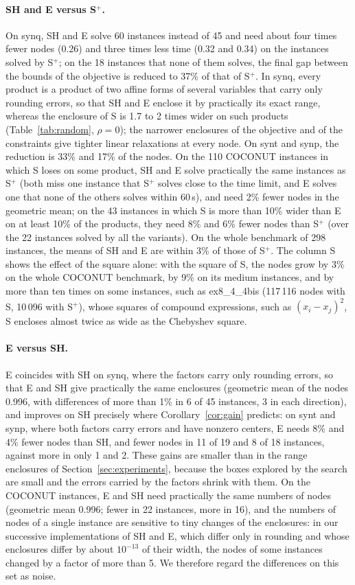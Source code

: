 \documentclass[11pt]{article}
\theoremstyle{definition}
\begin{document}
\paragraph{SH and E versus S$^+$.} On synq, SH and E solve 60 instances instead of 45 and need about four times fewer nodes (0.26) and three times less time (0.32 and 0.34) on the instances solved by S$^+$; on the 18 instances that none of them solves, the final gap between the bounds of the objective is reduced to 37\% of that of S$^+$. In synq, every product is a product of two affine forms of several variables that carry only rounding errors, so that SH and E enclose it by practically its exact range, whereas the enclosure of S is 1.7 to 2 times wider on such products (Table~\ref{tab:random}, $\rho=0$); the narrower enclosures of the objective and of the constraints give tighter linear relaxations at every node. On synt and synp, the reduction is 33\% and 17\% of the nodes. On the 110 COCONUT instances in which S loses on some product, SH and E solve practically the same instances as S$^+$ (both miss one instance that S$^+$ solves close to the time limit, and E solves one that none of the others solves within 60\,s), and need 2\% fewer nodes in the geometric mean; on the 43 instances in which S is more than 10\% wider than E on at least 10\% of the products, they need 8\% and 6\% fewer nodes than S$^+$ (over the 22 instances solved by all the variants). On the whole benchmark of 298 instances, the means of SH and E are within 3\% of those of S$^+$. The column S shows the effect of the square alone: with the square of S, the nodes grow by 3\% on the whole COCONUT benchmark, by 9\% on its medium instances, and by more than ten times on some instances, such as ex8\_4\_4bis (117\,116 nodes with S, 10\,096 with S$^+$), whose squares of compound expressions, such as $(x_i-x_j)^2$, S encloses almost twice as wide as the Chebyshev square.

\paragraph{E versus SH.} E coincides with SH on synq, where the factors carry only rounding errors, so that E and SH give practically the same enclosures (geometric mean of the nodes 0.996, with differences of more than 1\% in 6 of 45 instances, 3 in each direction), and improves on SH precisely where Corollary~\ref{cor:gain} predicts: on synt and synp, where both factors carry errors and have nonzero centers, E needs 8\% and 4\% fewer nodes than SH, and fewer nodes in 11 of 19 and 8 of 18 instances, against more in only 1 and 2. These gains are smaller than in the range enclosures of Section~\ref{sec:experiments}, because the boxes explored by the search are small and the errors carried by the factors shrink with them. On the COCONUT instances, E and SH need practically the same numbers of nodes (geometric mean 0.996; fewer in 22 instances, more in 16), and the numbers of nodes of a single instance are sensitive to tiny changes of the enclosures: in our successive implementations of SH and E, which differ only in rounding and whose enclosures differ by about $10^{-13}$ of their width, the nodes of some instances changed by a factor of more than 5. We therefore regard the differences on this set as noise.
\end{document}
